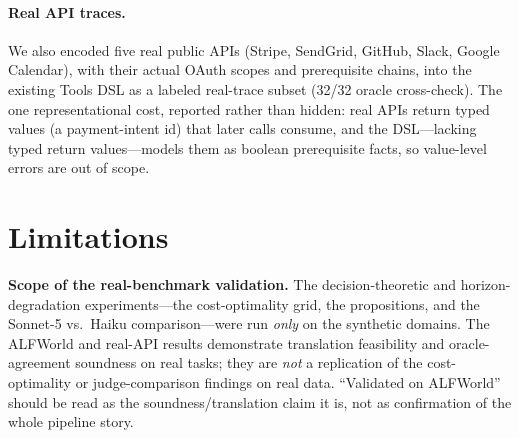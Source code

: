 \documentclass[letterpaper]{article}
\begin{document}
\paragraph{Real API traces.} We also encoded five real public APIs (Stripe,
SendGrid, GitHub, Slack, Google Calendar), with their actual OAuth scopes and
prerequisite chains, into the existing Tools DSL as a labeled real-trace
subset (32/32 oracle cross-check). The one representational cost, reported
rather than hidden: real APIs return typed values (a payment-intent id) that
later calls consume, and the DSL---lacking typed return values---models them
as boolean prerequisite facts, so value-level errors are out of scope.

\section{Limitations}

\textbf{Scope of the real-benchmark validation.} The decision-theoretic and
horizon-degradation experiments---the cost-optimality grid, the propositions,
and the Sonnet-5 vs.\ Haiku comparison---were run \emph{only} on the
synthetic domains. The ALFWorld and real-API results demonstrate translation
feasibility and oracle-agreement soundness on real tasks; they are
\emph{not} a replication of the cost-optimality or judge-comparison findings
on real data. ``Validated on ALFWorld'' should be read as the
soundness/translation claim it is, not as confirmation of the whole
pipeline story.
\end{document}
